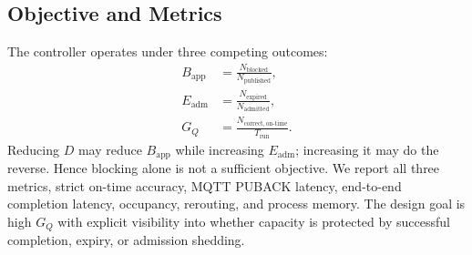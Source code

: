 \subsection{Objective and Metrics}

The controller operates under three competing outcomes:
\begin{align}
 B_{\mathrm{app}} &= \frac{N_{\mathrm{blocked}}}{N_{\mathrm{published}}},\\
 E_{\mathrm{adm}} &= \frac{N_{\mathrm{expired}}}{N_{\mathrm{admitted}}},\\
 G_Q &= \frac{N_{\mathrm{correct,on\mbox{-}time}}}{T_{\mathrm{run}}}.
\end{align}
Reducing $D$ may reduce $B_{\mathrm{app}}$ while increasing $E_{\mathrm{adm}}$; increasing it may do the reverse. Hence blocking alone is not a sufficient objective. We report all three metrics, strict on-time accuracy, MQTT PUBACK latency, end-to-end completion latency, occupancy, rerouting, and process memory. The design goal is high $G_Q$ with explicit visibility into whether capacity is protected by successful completion, expiry, or admission shedding.
